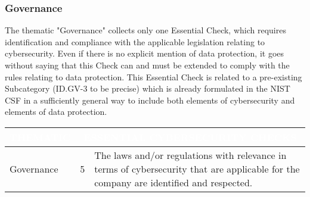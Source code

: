 \subsubsection{Governance}
The thematic "Governance" collects only one Essential Check, which requires identification and compliance with the applicable legislation relating to cybersecurity. Even if there is no explicit mention of data protection, it goes without saying that this Check can and must be extended to comply with the rules relating to data protection. This Essential Check is related to a pre-existing Subcategory (ID.GV-3 to be precise) which is already formulated in the NIST CSF in a sufficiently general way to include both elements of cybersecurity and elements of data protection.
\begin{table}[H]
\begin{tabularx}{\textwidth}{|>{\centering\arraybackslash}p{}|c|X|} 
\hline
{\cellcolor{dummy-cyan}}\textbf{\textcolor{white}{THEMATIC}} &
\multicolumn{2}{|c|}{{\cellcolor{dummy-cyan}}\textbf{\textcolor{white}{ESSENTIAL CYBERSECURITY CHECKS}}}\\ 
\hline
Governance & 5 & {The laws and/or regulations with relevance in terms of cybersecurity that are applicable for the company are identified and respected.}\\ 
\hline
\end{tabularx}
\end{table}
